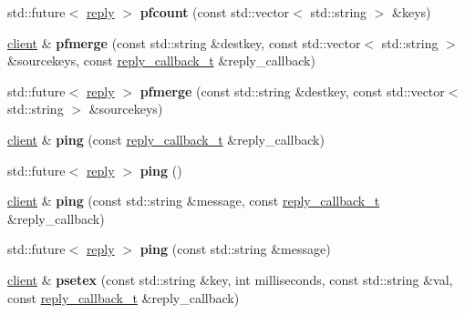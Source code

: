 \begin{DoxyCompactItemize}
std\+::future$<$ \hyperlink{classcpp__redis_1_1reply}{reply} $>$ {\bfseries pfcount} (const std\+::vector$<$ std\+::string $>$ \&keys)
\item 
\mbox{\label{classcpp__redis_1_1client_aad4f7f35b13e4d236d178ed47a499353}} 
\hyperlink{classcpp__redis_1_1client}{client} \& {\bfseries pfmerge} (const std\+::string \&destkey, const std\+::vector$<$ std\+::string $>$ \&sourcekeys, const \hyperlink{classcpp__redis_1_1client_a061a1140d36d2eaeda82b09a0bb3f9f2}{reply\+\_\+callback\+\_\+t} \&reply\+\_\+callback)
\item 
\mbox{\label{classcpp__redis_1_1client_acfeb0b2a7adb65d9cb940d96b9d24478}} 
std\+::future$<$ \hyperlink{classcpp__redis_1_1reply}{reply} $>$ {\bfseries pfmerge} (const std\+::string \&destkey, const std\+::vector$<$ std\+::string $>$ \&sourcekeys)
\item 
\mbox{\label{classcpp__redis_1_1client_a19f0127614ca1369dcf739427079f7ec}} 
\hyperlink{classcpp__redis_1_1client}{client} \& {\bfseries ping} (const \hyperlink{classcpp__redis_1_1client_a061a1140d36d2eaeda82b09a0bb3f9f2}{reply\+\_\+callback\+\_\+t} \&reply\+\_\+callback)
\item 
\mbox{\label{classcpp__redis_1_1client_a5273cf454284e04f4c43e1b391170009}} 
std\+::future$<$ \hyperlink{classcpp__redis_1_1reply}{reply} $>$ {\bfseries ping} ()
\item 
\mbox{\label{classcpp__redis_1_1client_a399c32f46d82d844b661647f64d9fb97}} 
\hyperlink{classcpp__redis_1_1client}{client} \& {\bfseries ping} (const std\+::string \&message, const \hyperlink{classcpp__redis_1_1client_a061a1140d36d2eaeda82b09a0bb3f9f2}{reply\+\_\+callback\+\_\+t} \&reply\+\_\+callback)
\item 
\mbox{\label{classcpp__redis_1_1client_a5efa4ecc6b105a2464b22cd873caae39}} 
std\+::future$<$ \hyperlink{classcpp__redis_1_1reply}{reply} $>$ {\bfseries ping} (const std\+::string \&message)
\item 
\mbox{\label{classcpp__redis_1_1client_a732ba849342f9d8c67111f6cb6cb198c}} 
\hyperlink{classcpp__redis_1_1client}{client} \& {\bfseries psetex} (const std\+::string \&key, int milliseconds, const std\+::string \&val, const \hyperlink{classcpp__redis_1_1client_a061a1140d36d2eaeda82b09a0bb3f9f2}{reply\+\_\+callback\+\_\+t} \&reply\+\_\+callback)

\end{DoxyCompactItemize}
